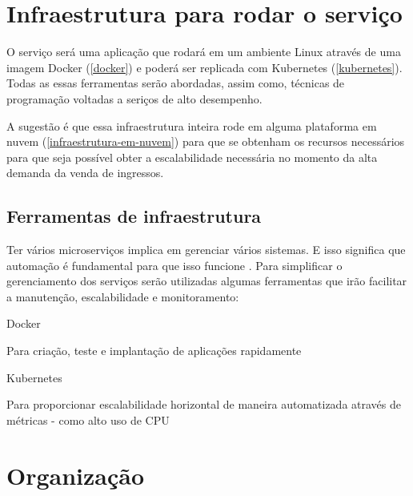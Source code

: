 \section{Infraestrutura para rodar o serviço}

O serviço será uma aplicação que rodará em um ambiente Linux através
de uma imagem Docker (\autoref{docker})
e poderá ser replicada com Kubernetes (\autoref{kubernetes}).
Todas as essas ferramentas
serão abordadas, assim como, técnicas de programação voltadas a seriços de alto
desempenho.

A sugestão é que essa infraestrutura inteira rode em alguma plataforma em nuvem
(\autoref{infraestrutura-em-nuvem}) para que se obtenham os recursos necessários para que
seja possível obter a escalabilidade necessária no momento da alta demanda da
venda de ingressos.

\subsection{Ferramentas de infraestrutura}

Ter vários microserviços implica em gerenciar
vários sistemas. E isso significa que automação é fundamental para que isso funcione
\cite{martin-fowler-microservices}.
Para simplificar o gerenciamento dos serviços serão utilizadas algumas ferramentas que
irão facilitar a manutenção, escalabilidade e monitoramento:

\begin{alineas}

  \item Docker

  \begin{alineas}
     \item Para criação, teste e implantação de aplicações rapidamente \cite{aws-o-que-e-o-docker}
  \end{alineas}

  \item Kubernetes

  \begin{alineas}
     \item Para proporcionar escalabilidade horizontal de maneira automatizada através de métricas
           - como alto uso de CPU \cite{kubernetes-horizontal-pod-autoscaling}
  \end{alineas}

\end{alineas}

\section{Organização}

